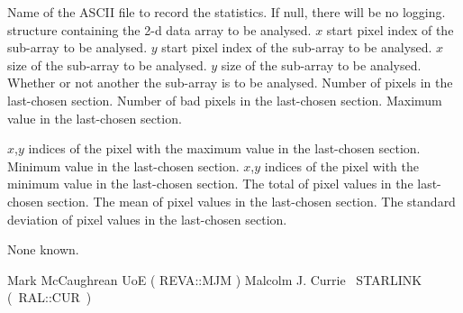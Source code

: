 {\begin{manroutinedescription}
\begin{manparametertable}
  Name of the ASCII file to record the statistics. If null,
  there will be no logging. {\mantt [!]}
  {} structure containing the 2-d data array to be analysed.
  {$x$} start pixel index of the sub-array to be analysed.
  {$y$} start pixel index of the sub-array to be analysed.
  {$x$} size of the sub-array to be analysed.
  {$y$} size of the sub-array to be analysed.
  Whether or not another the sub-array is to be analysed.
  Number of pixels in the last-chosen section.
  Number of bad pixels in the last-chosen section.
  Maximum value in the last-chosen section.
\end{manparametertable}
\begin{manparametertable}
  {$x$},{$y$} indices of the pixel with the maximum value in the
  last-chosen section. 
  Minimum value in the last-chosen section.
  {$x$},{$y$} indices of the pixel with the minimum value in the
  last-chosen section. 
  The total of pixel values in the last-chosen section.
  The mean of pixel values in the last-chosen section.
  The standard deviation of pixel values in the last-chosen section.
\end{manparametertable}
  None known.

  Mark McCaughrean UoE ( {\mantt REVA}::{\mantt MJM} )
  Malcolm J. Currie ~STARLINK \mbox{( {\mantt RAL}::{\mantt CUR} )}
\end{manroutinedescription}

}
